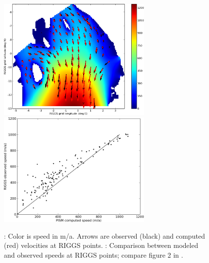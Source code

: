 \documentclass[11pt,final]{amsart}
\begin{document}
\begin{figure}[ht]
\mbox{\includegraphics[width=3in,keepaspectratio=true]{figs/rossquiver}\, \includegraphics[width=3in,keepaspectratio=true]{figs/rossscatter}}
\caption{: Color is speed in m/a.  Arrows are observed (black) and computed (red) velocities at RIGGS points.  : Comparison between modeled and observed speeds at RIGGS points; compare figure 2 in \cite{MacAyealetal}.}
\label{fig:rosspython}
\end{figure}



\clearpage\newpage



\appendix

\newcommand{\subsect}[1]{\bigskip\subsection{#1}\rule{0mm}{2mm}\par\medskip}
\newcommand{\subsectstar}[1]{\bigskip\noindent\textbf{#1.}\rule{0mm}{2mm}\par\medskip}
\newcommand{\subsubsect}[1]{\subsubsection{#1}\rule{0mm}{2mm}\par\smallskip}
\end{document}
